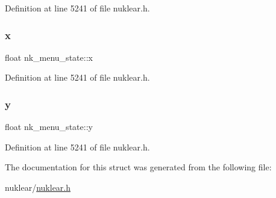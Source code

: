 Definition at line 5241 of file nuklear.\+h.

\mbox{\label{structnk__menu__state_a9a8e94b2aa566d747731e543de318150}} 
\subsubsection{\texorpdfstring{x}{x}}
{\footnotesize\ttfamily float nk\+\_\+menu\+\_\+state\+::x}



Definition at line 5241 of file nuklear.\+h.

\mbox{\label{structnk__menu__state_a23f425097a6d2ace1e954a593149584c}} 
\subsubsection{\texorpdfstring{y}{y}}
{\footnotesize\ttfamily float nk\+\_\+menu\+\_\+state\+::y}



Definition at line 5241 of file nuklear.\+h.



The documentation for this struct was generated from the following file\+:\begin{DoxyCompactItemize}
\item 
nuklear/\mbox{\hyperlink{nuklear_8h}{nuklear.\+h}}\end{DoxyCompactItemize}
